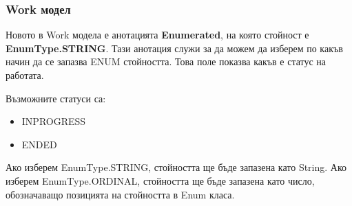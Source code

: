         \begin{figure}[h]
            \centering
            \caption{}
            \label{fig:application_entity}
        \end{figure}
        
        \subsubsection{Work модел}
        
        Новото в Work модела е анотацията \textbf{Enumerated}, на която стойност е \textbf{EnumType.STRING}. Тази анотация служи за да можем да изберем по какъв начин да се запазва ENUM стойността. Това поле показва какъв е статус на работата.
        
        Възможните статуси са:
        \begin{itemize}
            \item IN\textunderscore PROGRESS
            \item ENDED
        \end{itemize}
        
        Ако изберем EnumType.STRING, стойността ще бъде запазена като String. Ако изберем EnumType.ORDINAL, стойността ще бъде запазена като число, обозначаващо позицията на стойността в Enum класа.
        
        \begin{figure}[h]
            \centering
            \caption{}
            \label{fig:work_entity}
        \end{figure}
        
